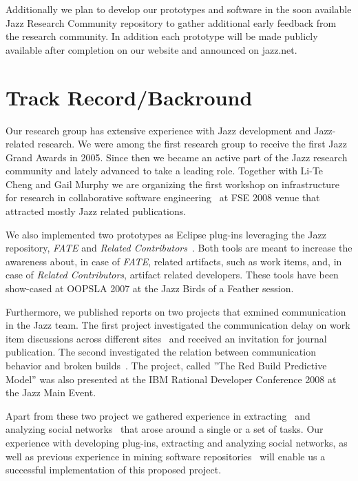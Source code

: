 \documentclass{sig-alternate}
\begin{document}
Additionally we plan to develop our prototypes and software in the soon
available Jazz Research Community repository to gather additional early feedback
from the research community. In addition each prototype will be made publicly
available after completion on our website and announced on jazz.net.

\section{Track Record/Backround}
Our research group has extensive experience with Jazz development and
Jazz-related research. We were among the first research group to receive the 
first Jazz Grand Awards in 2005. Since then we became an active part of
the Jazz research community and lately advanced to take a leading role. Together
with Li-Te Cheng and Gail Murphy we are organizing the first workshop on
infrastructure for research in collaborative software engineering~\cite{irecose08}
at FSE 2008 venue that attracted mostly Jazz related
publications.

We also implemented two prototypes as Eclipse plug-ins leveraging the Jazz
repository, \emph{FATE} and \emph{Related
Contributors}~\cite{panjer:2008:chase,panjer:tr2007}. Both tools are meant to
increase the awareness about, in case of \emph{FATE}, related artifacts, such as
work items, and, in case of \emph{Related Contributors}, artifact related
developers. These tools have been show-cased at OOPSLA 2007 at the Jazz Birds of
a Feather session.

Furthermore, we published reports on two projects that exmined communication in
the Jazz team. The first project investigated the communication delay on work
item discussions across different sites~\cite{Nguyen:2008Distance} and received
an invitation for journal publication. The second investigated the relation
between communication behavior and broken builds~\cite{wolf:tr2008}. The project,
called ''The Red Build Predictive Model''  was also presented at the IBM Rational
Developer Conference 2008 at the Jazz Main Event.

Apart from these two project we gathered experience in
extracting~\cite{wolf:ieee2009} and analyzing social
networks~\cite{damian2007dmk,sabrina:re08} that arose around a single or a set of
tasks. Our experience with developing plug-ins, extracting and analyzing social
networks, as well as previous experience in mining software
repositories~\cite{schroeter-isese-2006b} will enable us a successful
implementation of this proposed project.

\small

  
\end{document}
